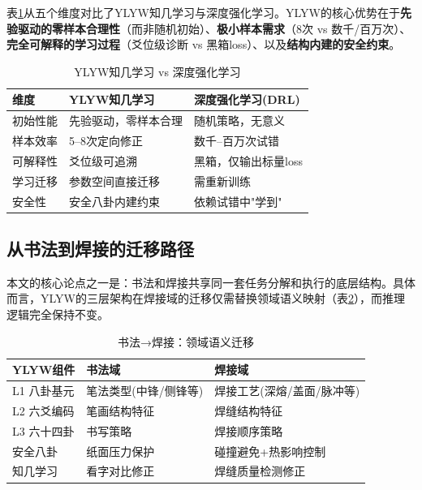 \documentclass[12pt,a4paper]{article}
\begin{document}
表\ref{tab:comparison}从五个维度对比了YLYW知几学习与深度强化学习。YLYW的核心优势在于\textbf{先验驱动的零样本合理性}（而非随机初始）、\textbf{极小样本需求}（8次 vs 数千/百万次）、\textbf{完全可解释的学习过程}（爻位级诊断 vs 黑箱loss）、以及\textbf{结构内建的安全约束}。

\begin{table}[htbp]
\centering
\caption{YLYW知几学习 vs 深度强化学习}
\label{tab:comparison}
\begin{tabular}{p{2.5cm}p{4.5cm}p{4.5cm}}
\toprule
维度 & YLYW知几学习 & 深度强化学习(DRL) \\
\midrule
初始性能 & 先验驱动，零样本合理 & 随机策略，无意义 \\
样本效率 & 5--8次定向修正 & 数千--百万次试错 \\
可解释性 & 爻位级可追溯 & 黑箱，仅输出标量loss \\
学习迁移 & 参数空间直接迁移 & 需重新训练 \\
安全性 & 安全八卦内建约束 & 依赖试错中"学到" \\
\bottomrule
\end{tabular}
\end{table}

\subsection{从书法到焊接的迁移路径}

本文的核心论点之一是：书法和焊接共享同一套任务分解和执行的底层结构。具体而言，YLYW的三层架构在焊接域的迁移仅需替换领域语义映射（表\ref{tab:welding_mapping}），而推理逻辑完全保持不变。

\begin{table}[htbp]
\centering
\caption{书法→焊接：领域语义迁移}
\label{tab:welding_mapping}
\small
\begin{tabular}{p{3cm}p{4cm}p{4cm}}
\toprule
YLYW组件 & 书法域 & 焊接域 \\
\midrule
L1 八卦基元 & 笔法类型(中锋/侧锋等) & 焊接工艺(深熔/盖面/脉冲等) \\
L2 六爻编码 & 笔画结构特征 & 焊缝结构特征 \\
L3 六十四卦 & 书写策略 & 焊接顺序策略 \\
安全八卦 & 纸面压力保护 & 碰撞避免+热影响控制 \\
知几学习 & 看字对比修正 & 焊缝质量检测修正 \\
\bottomrule
\end{tabular}
\end{table}
\end{document}
